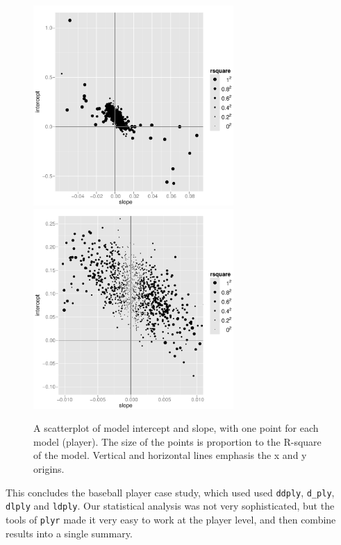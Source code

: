 \documentclass[letterpaper,oneside]{scrartcl}
\begin{document}
\begin{figure}[htbp]
  \centering
    \includegraphics[width=3in]{models}
    \includegraphics[width=3in]{models-zoom}
  \caption{A scatterplot of model intercept and slope, with one point for each model (player).  The size of the points is proportion to the R-square of the model. Vertical and horizontal lines emphasis the x and y origins. }
  \label{fig:models}
\end{figure}

This concludes the baseball player case study, which used used {\tt ddply}, {\tt d\_ply}, {\tt dlply} and {\tt ldply}.  Our statistical analysis was not very sophisticated, but the tools of {\tt plyr} made it very easy to work at the player level, and then combine results into a single summary.  
\end{document}
